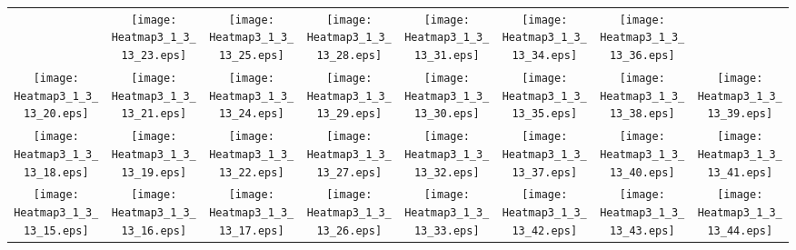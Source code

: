 \documentclass{standalone}
\begin{document}
\renewcommand{\arraystretch}{0}
\setlength{\tabcolsep}{0pt}
\begin{tabular}{ *8{c} }
 & \texttt{[image: Heatmap3\_1\_3\_13\_23.eps]} & \texttt{[image: Heatmap3\_1\_3\_13\_25.eps]} & \texttt{[image: Heatmap3\_1\_3\_13\_28.eps]} & \texttt{[image: Heatmap3\_1\_3\_13\_31.eps]} & \texttt{[image: Heatmap3\_1\_3\_13\_34.eps]} & \texttt{[image: Heatmap3\_1\_3\_13\_36.eps]} &  \\
\texttt{[image: Heatmap3\_1\_3\_13\_20.eps]} & \texttt{[image: Heatmap3\_1\_3\_13\_21.eps]} & \texttt{[image: Heatmap3\_1\_3\_13\_24.eps]} & \texttt{[image: Heatmap3\_1\_3\_13\_29.eps]} & \texttt{[image: Heatmap3\_1\_3\_13\_30.eps]} & \texttt{[image: Heatmap3\_1\_3\_13\_35.eps]} & \texttt{[image: Heatmap3\_1\_3\_13\_38.eps]} & \texttt{[image: Heatmap3\_1\_3\_13\_39.eps]} \\
\texttt{[image: Heatmap3\_1\_3\_13\_18.eps]} & \texttt{[image: Heatmap3\_1\_3\_13\_19.eps]} & \texttt{[image: Heatmap3\_1\_3\_13\_22.eps]} & \texttt{[image: Heatmap3\_1\_3\_13\_27.eps]} & \texttt{[image: Heatmap3\_1\_3\_13\_32.eps]} & \texttt{[image: Heatmap3\_1\_3\_13\_37.eps]} & \texttt{[image: Heatmap3\_1\_3\_13\_40.eps]} & \texttt{[image: Heatmap3\_1\_3\_13\_41.eps]} \\
\texttt{[image: Heatmap3\_1\_3\_13\_15.eps]} & \texttt{[image: Heatmap3\_1\_3\_13\_16.eps]} & \texttt{[image: Heatmap3\_1\_3\_13\_17.eps]} & \texttt{[image: Heatmap3\_1\_3\_13\_26.eps]} & \texttt{[image: Heatmap3\_1\_3\_13\_33.eps]} & \texttt{[image: Heatmap3\_1\_3\_13\_42.eps]} & \texttt{[image: Heatmap3\_1\_3\_13\_43.eps]} & \texttt{[image: Heatmap3\_1\_3\_13\_44.eps]} \\

\end{tabular}
\end{document}
